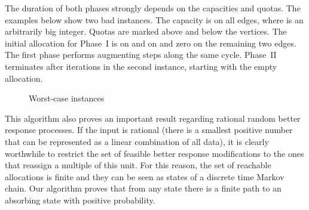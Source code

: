 \documentclass{llncs}
\begin{document}
The duration of both phases strongly depends on the capacities and quotas. The examples below show two bad instances. The capacity is  on all edges, where  is an arbitrarily big integer. Quotas are marked above and below the vertices. The initial allocation for Phase~I is  on  and on  and zero on the remaining two edges. The first phase performs  augmenting steps along the same cycle. Phase~II terminates after  iterations in the second instance, starting with the empty allocation.
\begin{figure}[H]
\begin{center}
\end{center}
\caption{Worst-case instances}
\label{fig:worst_case}
\end{figure}

This algorithm also proves an important result regarding rational random better response processes. If the input is rational (there is a smallest positive number that can be represented as a linear combination of all data), it is clearly worthwhile to restrict the set of feasible better response modifications to the ones that reassign a multiple of this unit. For this reason, the set of reachable allocations is finite and they can be seen as states of a discrete time Markov chain. Our algorithm proves that from any state there is a finite path to an absorbing state with positive probability.
\end{document}
